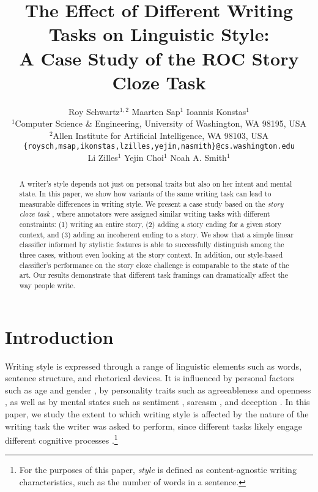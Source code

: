 \documentclass[11pt,a4paper]{article}
\title{The Effect of Different Writing Tasks on Linguistic Style:\\ A Case Study of the ROC Story Cloze Task}
\author{\hspace{2cm}Roy Schwartz$^{1,2}$ \And \hspace{2.5cm}Maarten Sap$^1$ \And \hspace{3cm}Ioannis Konstas$^1$ \And \\
  $^1$Computer Science \& Engineering, University of Washington, WA 98195, USA \\
  $^2$Allen Institute for Artificial Intelligence, WA 98103, USA \\
    {\tt \{roysch,msap,ikonstas,lzilles,yejin,nasmith\}@cs.washington.edu}  \\
    \And \hspace{-2cm}Li Zilles$^1$ \And \hspace{-2.5cm}Yejin Choi$^1$ \And \hspace{-2.5cm}Noah A. Smith$^1$ \\
  }
\date{}
\newcommand{\resolved}[1]{}
\newcommand{\roy}[1]{{\color{orange}\textsc{[#1 --rs]}}}
\newcommand{\nascomment}[1]{{\color{blue}\textsc{[#1 --nas]}}}
\newcommand{\clinic}[1]{{\color{magenta}\textsc{[#1 --CLINIC]}}}
\renewcommand{\roy}[1]{{\color{orange}[#1 --rs]}}
\renewcommand{\roy}[1]{#1}
\renewcommand{\nascomment}[1]{}
\begin{document}
\maketitle
\begin{abstract}
A writer's style depends not just on personal traits but also on her intent and mental state.
In this paper, we show how variants of the same writing task can lead to measurable differences in writing style.
We present a case study based on 
the  {\it story cloze task} \cite{Mostafazadeh:2016},
where annotators were assigned similar writing tasks with different constraints: (1) writing an entire story, (2) adding a story ending for a given story context, and (3) adding an incoherent ending to a story.\resolved{\clinic{Many felt these 2 constraints looks like 3 constraints. clarify}}
We show that a simple linear classifier informed by stylistic features is able to successfully distinguish among the three cases, without even looking at the story context.
\roy{In addition, our style-based classifier's performance on the
  story cloze challenge is comparable to the state of the art.}
Our results demonstrate that different task framings can dramatically affect the way people write.\resolved{\clinic{Similarly to previous comment: which results does this comment address?}}


\resolved{They also provide important lessons for designing new NLP
tasks. \nascomment{drop this sentence if we only have a paragraph
  about this at the end, as we currently do}}

\end{abstract}

\section{Introduction}
Writing style is expressed through a range of linguistic elements such as words, sentence structure, and rhetorical devices.
It is influenced by personal factors such as age and gender \cite{Schler:2006}, 
by personality traits such as agreeableness and openness  \cite{Ireland:2014b},
as well as by mental states\resolved{\clinic{Avoid using ``cognitive"?}} such as sentiment \cite{Davidov:2010}, sarcasm \cite{Tsur:2010}, and deception \cite{Feng:2012}.  
In this paper, we study the extent to which writing style is affected by the nature of the writing task the writer was asked to perform, since
different tasks likely engage different cognitive processes \cite{Campbell:2003,Banerjee:2014}.\roy{\footnote{For the purposes of this paper, \emph{style} is defined as content-agnostic writing characteristics, such as the number of words in a sentence.}}
\end{document}
